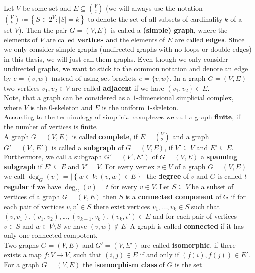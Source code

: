 Let \(V\) be some set and \(E\subseteq\binom{V}{2}\) (we will always use the notation\\
\(\binom{V}{k}\coloneqq \left\{S\in 2^V:\left|S\right|=k\right\}\) to denote the set of all subsets of cardinality \(k\) of a set \(V\)). Then the pair \(G=\left(V,E\right)\) is called a \textbf{(simple) graph}, where the elements of \(V\) are called \textbf{vertices} and the elements of \(E\) are called \textbf{edges}. Since we only consider simple graphs (undirected graphs with no loops or double edges) in this thesis, we will just call them graphs. Even though we only consider undirected graphs, we want to stick to the common notation and denote an edge by \(e=(v,w)\) instead of using set brackets \(e=\{v,w\}\). In a graph \(G=(V,E)\) two vertices \(v_1,v_2\in V\) are called \textbf{adjacent} if we have \((v_1,v_2)\in E\).\\
Note, that a graph can be considered as a \(1\)-dimensional simplicial complex, where \(V\) is the \(0\)-skeleton and \(E\) is the uniform \(1\)-skeleton.\\
According to the terminology of simplicial complexes we call a graph \textbf{finite}, if the number of vertices is finite.\\
A graph \(G=(V,E)\) is called \textbf{complete}, if \(E=\binom{V}{2}\) and a graph \(G'=(V',E')\) is called a \textbf{subgraph} of \(G=(V,E)\), if \(V'\subseteq V\) and \(E'\subseteq E\). Furthermore, we call a subgraph \(G'=(V',E')\) of \(G=(V,E)\) a \textbf{spanning subgraph} if \(E'\subseteq E\) and \(V'=V\). For every vertex \(v\in V\) of a graph \(G=(V,E)\) we call \(\deg_G(v)\coloneqq \left|\left\{w\in V:(v,w)\in E\right\}\right|\) the \textbf{degree} of \(v\) and \(G\) is called \(t\)-\textbf{regular} if we have \(\deg_G(v)=t\) for every \(v\in V\). Let \(S\subseteq V\) be a subset of vertices of a graph \(G=(V,E)\) then \(S\) is a \textbf{connected component} of \(G\) if for each pair of vertices \(v,v'\in S\) there exist vertices \(v_1,\ldots,v_k\in S\) such that \((v,v_1),(v_1,v_2),\ldots,(v_{k-1},v_k),(v_k,v')\in E\) and for each pair of vertices \(v\in S\) and \(w\in V\setminus S\) we have \((v,w)\notin E\). A graph is called \textbf{connected} if it has only one connected compotent.\\
Two graphs \(G=(V,E)\) and \(G'=(V,E')\) are called \textbf{isomorphic}, if there exists a map \(f:V\rightarrow V\), such that \((i,j)\in E\) if and only if \((f(i),f(j))\in E'\). For a graph \(G=(V,E)\) the \textbf{isomorphism class} of \(G\) is the set
